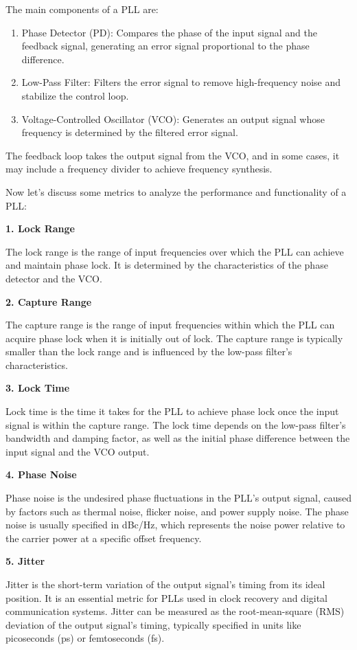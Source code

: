 \documentclass[
]{article}
\begin{document}
The main components of a PLL are:

\begin{enumerate}
\def\labelenumi{\arabic{enumi}.}
\item
  Phase Detector (PD): Compares the phase of the input signal and the
  feedback signal, generating an error signal proportional to the phase
  difference.
\item
  Low-Pass Filter: Filters the error signal to remove high-frequency
  noise and stabilize the control loop.
\item
  Voltage-Controlled Oscillator (VCO): Generates an output signal whose
  frequency is determined by the filtered error signal.
\end{enumerate}

The feedback loop takes the output signal from the VCO, and in some
cases, it may include a frequency divider to achieve frequency
synthesis.

Now let's discuss some metrics to analyze the performance and
functionality of a PLL:

\textbf{1. Lock Range}

The lock range is the range of input frequencies over which the PLL can
achieve and maintain phase lock. It is determined by the characteristics
of the phase detector and the VCO.

\textbf{2. Capture Range}

The capture range is the range of input frequencies within which the PLL
can acquire phase lock when it is initially out of lock. The capture
range is typically smaller than the lock range and is influenced by the
low-pass filter's characteristics.

\textbf{3. Lock Time}

Lock time is the time it takes for the PLL to achieve phase lock once
the input signal is within the capture range. The lock time depends on
the low-pass filter's bandwidth and damping factor, as well as the
initial phase difference between the input signal and the VCO output.

\textbf{4. Phase Noise}

Phase noise is the undesired phase fluctuations in the PLL's output
signal, caused by factors such as thermal noise, flicker noise, and
power supply noise. The phase noise is usually specified in dBc/Hz,
which represents the noise power relative to the carrier power at a
specific offset frequency.

\textbf{5. Jitter}

Jitter is the short-term variation of the output signal's timing from
its ideal position. It is an essential metric for PLLs used in clock
recovery and digital communication systems. Jitter can be measured as
the root-mean-square (RMS) deviation of the output signal's timing,
typically specified in units like picoseconds (ps) or femtoseconds (fs).
\end{document}
